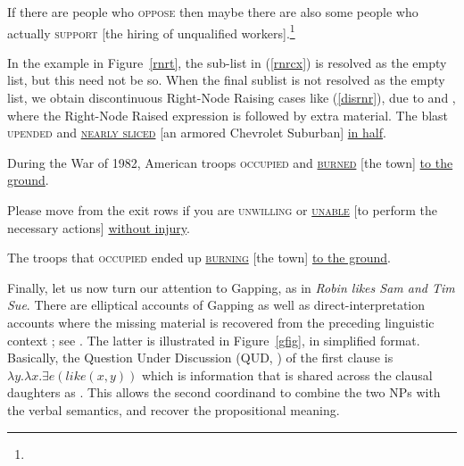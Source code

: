 \ex If there are people who \textsc{oppose} then maybe there are also some
  people who actually \textsc{support}  [the hiring of unqualified
  workers].\footnote{}

\zl




In the example in Figure~\ref{rnrt}, the sub-list  in (\ref{rnrcx}) is resolved as the empty list, but this need not be so. When the final sublist is not resolved as the empty list, we obtain discontinuous Right-Node Raising cases like (\ref{disrnr}), due to  \citet[238--240]{Whitman:09}
and \citet[868]{chavesrnr}, where the Right-Node Raised expression is followed by extra material. 
\eal
\label{disrnr}
\ex The blast \textsc{upended} and \underline{\textsc{nearly sliced}} [an armored Chevrolet Suburban] \underline{in half}.

\ex During the War of 1982, American troops \textsc{occupied}  and \underline{\textsc{burned}} [the town] \underline{to the ground}.

\ex Please move from the exit rows if you are \textsc{unwilling} or \underline{\textsc{unable}}
 [to perform the necessary actions] \underline{without injury}.

\ex The troops that \textsc{occupied} ended up \underline{\textsc{burning}} [the town] \underline{to the ground}.
\zl\label{coord:page-rnr-I-phi-end}\label{coordination:page-rnr-end}

Finally, let us now turn our attention to Gapping, as in 
\emph{Robin likes Sam and Tim \trace{} Sue}.
There are elliptical accounts of Gapping  \citep{chaves06} as well as direct-interpretation accounts where the missing material is recovered from the preceding linguistic context  \citep{Mouret:06,Abeille:Blbie:Mouret:14,sangheepark}; see . The latter is illustrated in Figure~\ref{gfig}, in simplified format. Basically, the Question Under Discussion (QUD, \citealp{roberts96}) of the first clause is $\lambda y.\lambda x. \exists e(like(x,y))$ which is information that is shared across the clausal daughters as .
This allows the second coordinand to combine the two NPs with the verbal semantics, and recover the propositional meaning.



